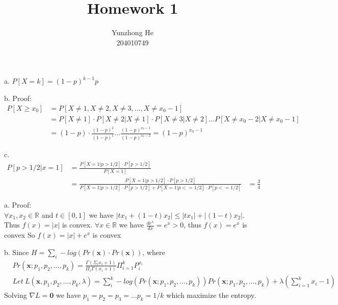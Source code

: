 \documentclass[12pt]{article}
\newenvironment{problem}[2][Problem]{\begin{trivlist}
\item[\hskip \labelsep {\bfseries #1}\hskip \labelsep {\bfseries #2}]}{\end{trivlist}}
\begin{document}
 
 
\title{Homework 1}%
\author{Yunzhong He\\ %
204010749} %
 
\maketitle
 
\begin{problem}{1. Sequence of Coin Flips}
\item {a.} {\begin{math} P[X=k] = (1-p)^{k-1}p \end{math}}
\item {b.} {Proof:}
 	\begin{align*}
	  P[X \geq x_0] & = P[X\neq1, X\neq2, X\neq3, \dots, X\neq x_0-1]\\
			& = P[X\neq1] \cdot P[X\neq2 | X\neq1] \cdot P[X\neq3 | X\neq2] \dots P[X\neq x_0-2 | X\neq x_0-1]\\
			& = (1-p) \cdot \frac{(1-p)^2}{(1-p)^1} \dots \frac{(1-p)^{x_0-1}}{(1-p)^{x_0-2}} = (1-p)^{x_0-1}
 	\end{align*}
\item {c.}
	\begin{align*}
			P[p>1/2|x=1] & = \frac{P[X=1|p>1/2] \cdot P[p>1/2]}{P[X=1]}\\
			& = \frac{P[X=1|p>1/2] \cdot P[p>1/2]}{P[X=1|p>1/2] \cdot P[p>1/2] + P[X=1|p<=1/2] \cdot P[p<=1/2]}
			& = \frac{3}{4}
	\end{align*}
\end{problem}

\begin{problem} {2. Convex Functions and Information Theory}
\item {a.} {Proof:\\}
		$\forall x_1, x_2 \in \mathbb{R}$ and $t \in [0,1]$ we have
		$|tx_1+(1-t)x_2|\leq |tx_1| + |(1-t)x_2|$. Thus $f(x) = |x|$ is convex.
		$\forall x \in \mathbb{R}$ we have $\frac{de^x}{dx} = e^x > 0$, thus $f(x) = e^x$ is convex
		So $f(x) = |x| + e^x$  is convex
\item {b.}
		Since $H = \sum_i-log(Pr(\textbf{x}) \cdot Pr(\textbf{x}))$, where
		\begin{align*}
			& Pr(\textbf{x};p_1, p_2, \dots, p_k) = \frac{\Gamma(\Sigma_ix_i+1)}{\Pi_i\Gamma(x_i+1)}\Pi_{i=1}^kP_i^{x_i} \\
			& Let \ L(\textbf{x}, p_1, p_2, \dots, p_k, \lambda) = \sum_i^k-log(Pr(\textbf{x};p_1, p_2, \dots, p_k))Pr(\textbf{x};p_1, p_2, \dots, p_k) + \lambda(\sum_{i=1}^kx_i-1) 
		\end{align*}
		Solving $\nabla L = \textbf{0}$ we have $ p_1 = p_2 = p_3 = \dots p_k = 1/k$ which maximize the entropy.
\end{problem}
\end{document}

